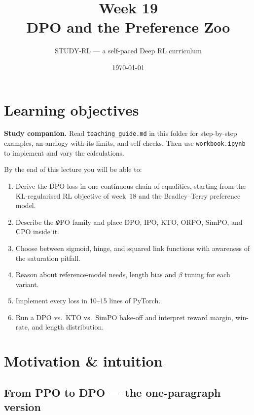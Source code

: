 \documentclass[11pt,oneside]{scrbook}
\title{{\color{rlblue}\textbf{Week 19} \\ \Huge DPO and the Preference Zoo}}
\author{STUDY-RL --- a self-paced Deep RL curriculum}
\date{\today}
\begin{document}
\maketitle
\tableofcontents
\newpage

\chapter*{Learning objectives}


\noindent\textbf{Study companion.} Read \texttt{teaching\_guide.md} in this
folder for step-by-step examples, an analogy with its limits, and self-checks.
Then use \texttt{workbook.ipynb} to implement and vary the calculations.
\par\medskip

\begin{keyidea}
By the end of this lecture you will be able to:
\begin{enumerate}[leftmargin=*]
  \item Derive the DPO loss in one continuous chain of equalities,
        starting from the KL-regularised RL objective of week~18 and
        the Bradley--Terry preference model.
  \item Describe the $\Psi$PO family and place DPO, IPO, KTO, ORPO,
        SimPO, and CPO inside it.
  \item Choose between sigmoid, hinge, and squared link functions
        with awareness of the saturation pitfall.
  \item Reason about reference-model needs, length bias and $\beta$
        tuning for each variant.
  \item Implement every loss in 10--15 lines of PyTorch.
  \item Run a DPO vs.\ KTO vs.\ SimPO bake-off and interpret reward
        margin, win-rate, and length distribution.
\end{enumerate}
\end{keyidea}

\chapter{Motivation \& intuition}

\section{From PPO to DPO --- the one-paragraph version}
\end{document}
